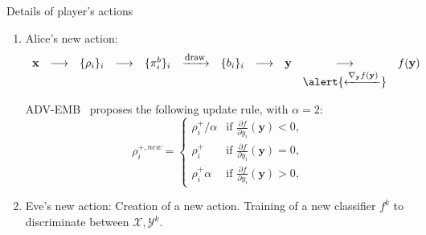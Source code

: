 \documentclass[10pt,aspectratio=169]{beamer}
\begin{document}
\begin{frame}{Details of player's actions}

    \begin{enumerate}

        \item \alert{Alice's new action:}
            \begin{equation*}
                \begin{array}{ccccccccccc}
                    \mathbf{x} & \longrightarrow & \{\rho_i\}_i & \longrightarrow & \{\pi_i^b\}_i &   \xrightarrow{\mbox{\footnotesize{draw}}} & \{b_i\}_i &  \longrightarrow & \mathbf{y} & \longrightarrow  & f(\mathbf{y}) \\
                    & & & & & & & & & \alert{\xleftarrow{ \nabla_{\mathbf{y}} f(\mathbf{y}) }} 
                \end{array}    
            \end{equation*}

        ADV-EMB~ proposes the following update rule, with $\alpha=2$:
        \begin{equation}
            \rho_{i}^{+, new} = 
            \left\{
                \begin{array}{ll}
                    \rho_{i}^+/\alpha & \mbox{if } \frac{\partial f}{\partial y_{i}}\left(\mathbf{y}\right) < 0, \\
                    \rho_{i}^+ & \mbox{if } \frac{\partial f}{\partial y_{i}}\left(\mathbf{y}\right) = 0, \\
                    \rho_{i}^+ \alpha & \mbox{if } \frac{\partial f}{\partial y_{i}}\left(\mathbf{y}\right) > 0,
                \end{array}
            \right.
            \label{eq:qplus}
        \end{equation}

        \pause
        \item \alert{Eve's new action:} Creation of a new action. Training of a new classifier $f^k$ to discriminate between $\mathcal{X}, \mathcal{Y}^k$.

    \end{enumerate}

\end{frame}







\end{document}
